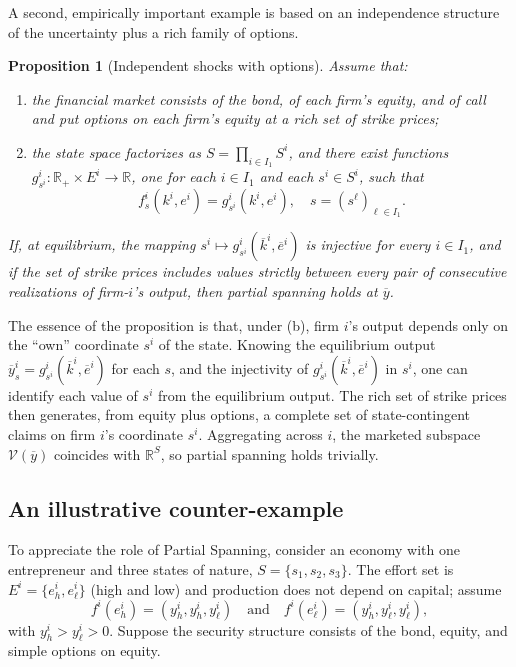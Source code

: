 \documentclass[11pt,a4paper,oneside]{book}
\def\R{\mathbb{R}}
\def\et{\quad \text{and} \quad}
\theoremstyle{plain}
\newtheorem{proposition}[theorem]{Proposition}
\theoremstyle{definition}
\theoremstyle{remark}
\numberwithin{equation}{chapter}
\begin{document}
A second, empirically important example is based on an independence structure of the uncertainty plus a rich family of options.

\begin{proposition}[Independent shocks with options]\label{prop:PS-options}
Assume that:
\begin{enumerate}
  \item[\textup{(a)}] the financial market consists of the bond, of each firm's equity, and of call and put options on each firm's equity at a rich set of strike prices;
  \item[\textup{(b)}] the state space factorizes as $S = \prod_{i \in I_1} S^i$, and there exist functions $g^i_{s^i} : \R_+ \times E^i \to \R$, one for each $i \in I_1$ and each $s^i \in S^i$, such that
  \begin{equation*}
    f^i_s(k^i, e^i) = g^i_{s^i}(k^i, e^i),
    \quad s = (s^\ell)_{\ell \in I_1}.
  \end{equation*}
\end{enumerate}
If, at equilibrium, the mapping $s^i \mapsto g^i_{s^i}(\overline{k}^i, \overline{e}^i)$ is injective for every $i \in I_1$, and if the set of strike prices includes values strictly between every pair of consecutive realizations of firm-$i$'s output, then partial spanning holds at $\overline{y}$.
\end{proposition}

The essence of the proposition is that, under (b), firm $i$'s output depends only on the ``own'' coordinate $s^i$ of the state.
Knowing the equilibrium output $\overline{y}^i_s = g^i_{s^i}(\overline{k}^i, \overline{e}^i)$ for each $s$, and the injectivity of $g^i_{s^i}(\overline{k}^i, \overline{e}^i)$ in $s^i$, one can identify each value of $s^i$ from the equilibrium output.
The rich set of strike prices then generates, from equity plus options, a complete set of state-contingent claims on firm $i$'s coordinate $s^i$.
Aggregating across $i$, the marketed subspace $\mathcal{V}(\overline{y})$ coincides with $\R^S$, so partial spanning holds trivially.

\subsection{An illustrative counter-example}

To appreciate the role of Partial Spanning, consider an economy with one entrepreneur and three states of nature, $S = \{s_1, s_2, s_3\}$.
The effort set is $E^i = \{e^i_h, e^i_\ell\}$ (high and low) and production does not depend on capital; assume
\begin{equation*}
  f^i(e^i_h) = (y^i_h, y^i_h, y^i_\ell)
  \et
  f^i(e^i_\ell) = (y^i_h, y^i_\ell, y^i_\ell),
\end{equation*}
with $y^i_h > y^i_\ell > 0$.
Suppose the security structure consists of the bond, equity, and simple options on equity.
\end{document}
